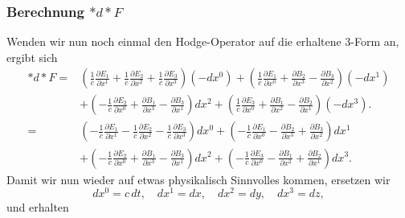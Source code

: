 \subsubsection{Berechnung $\ast d \ast F$}
Wenden wir nun noch einmal den Hodge-Operator auf die erhaltene 3-Form an, ergibt sich
\begin{align*}
	\ast d \ast F = 
	&\left( \frac{1}{c}\frac{\partial E_1}{\partial x^1} + \frac{1}{c}\frac{\partial E_2}{\partial x^2} + \frac{1}{c}\frac{\partial E_3}{\partial x^3} \right) (-dx^0) +
	\left(\frac{1}{c}\frac{\partial E_1}{\partial x^0} + \frac{\partial B_2}{\partial x^3} - \frac{\partial B_3}{\partial x^2} \right) (-dx^1)\\
	& + \left( -\frac{1}{c}\frac{\partial E_2}{\partial x^0} + \frac{\partial B_1}{\partial x^3} - \frac{\partial B_3}{\partial x^1} \right) dx^2 +
	\left( \frac{1}{c}\frac{\partial E_3}{\partial x^0} + \frac{\partial B_1}{\partial x^2} - \frac{\partial B_2}{\partial x^1} \right) (-dx^3).\\[2ex]
	=
	&\left( -\frac{1}{c}\frac{\partial E_1}{\partial x^1} -\frac{1}{c}\frac{\partial E_2}{\partial x^2} - \frac{1}{c}\frac{\partial E_3}{\partial x^3} \right) dx^0 +
	\left(-\frac{1}{c}\frac{\partial E_1}{\partial x^0} - \frac{\partial B_2}{\partial x^3} + \frac{\partial B_3}{\partial x^2} \right) dx^1\\
	& + \left( -\frac{1}{c}\frac{\partial E_2}{\partial x^0} + \frac{\partial B_1}{\partial x^3} - \frac{\partial B_3}{\partial x^1} \right) dx^2 +
	\left( -\frac{1}{c}\frac{\partial E_3}{\partial x^0} - \frac{\partial B_1}{\partial x^2} + \frac{\partial B_2}{\partial x^1} \right) dx^3.
\end{align*}
Damit wir nun wieder auf etwas physikalisch Sinnvolles kommen, ersetzen wir
\begin{equation}
	dx^0 = c\,dt, \quad dx^1 = dx, \quad dx^2 = dy, \quad dx^3 = dz,
\end{equation}
und erhalten
